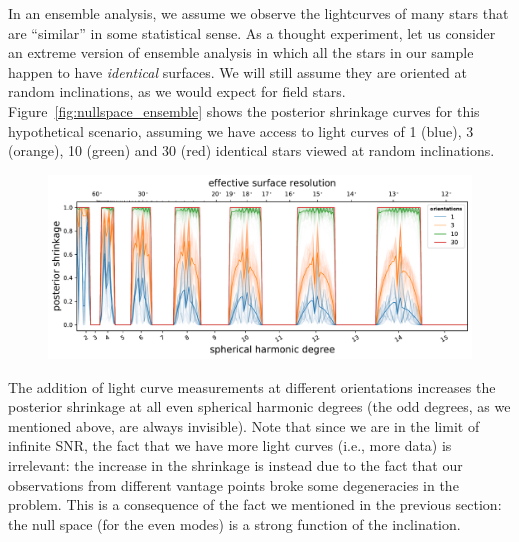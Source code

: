 \documentclass[modern]{aastex62}
\begin{document}
In an ensemble analysis, we assume we observe the lightcurves of many stars
that are ``similar'' in some statistical sense. As a thought experiment,
let us consider an extreme version of ensemble analysis in which all the
stars in our sample happen to have \emph{identical} surfaces. We will
still assume they are oriented at random inclinations, as we would expect for
field stars.
%
Figure~\ref{fig:nullspace_ensemble} shows the posterior shrinkage
curves for this hypothetical scenario, assuming we have access to
light curves of 1 (blue), 3 (orange), 10 (green) and 30 (red)
identical stars viewed at random inclinations.

\begin{figure}[t!]
    \begin{centering}
        \includegraphics[width=\linewidth]{figures/nullspace_ensemble.pdf}
    \end{centering}
\end{figure}

The addition of light curve measurements at different orientations
increases the posterior shrinkage at all even spherical harmonic degrees
(the odd degrees, as we mentioned above, are always invisible).
Note that since we are in the limit of infinite SNR, the fact that we have
more light curves (i.e., more data) is irrelevant: the
increase in the shrinkage is instead due to the fact that our observations
from different vantage points broke some degeneracies in the problem.
This is a consequence of the fact we mentioned in the previous section:
the null space (for the even modes)
is a strong function of the inclination.
\end{document}
